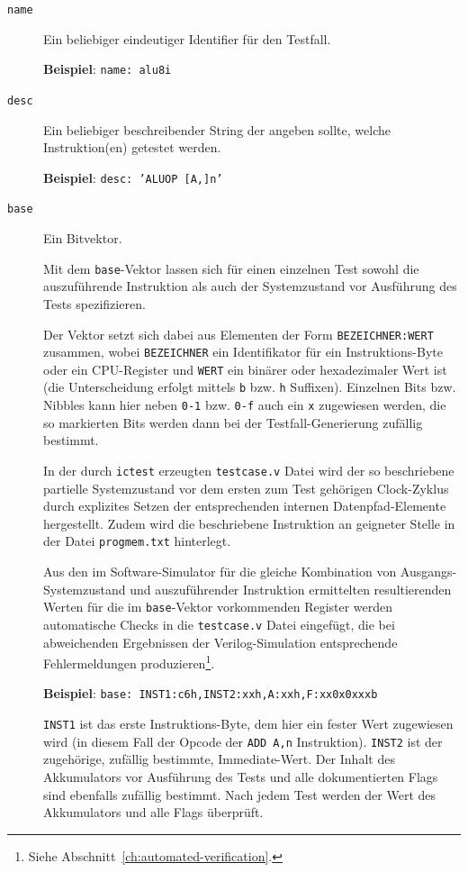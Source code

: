 \documentclass[ngerman, cd=lightcolor]{tudscrreprt}
\begin{document}
\begin{description}
\item[\texttt{name}] Ein beliebiger eindeutiger Identifier für den Testfall.

\textbf{Beispiel}: \texttt{name: alu8i}

\item[\texttt{desc}] Ein beliebiger beschreibender String der angeben sollte,
welche Instruktion(en) getestet werden.

\textbf{Beispiel}: \texttt{desc: 'ALUOP [A,]n'}

\item[\texttt{base}] Ein Bitvektor.

Mit dem \texttt{base}-Vektor lassen sich für einen einzelnen Test sowohl die
auszuführende Instruktion als auch der Systemzustand vor Ausführung des Tests
spezifizieren.

Der Vektor setzt sich dabei aus Elementen der Form \texttt{BEZEICHNER:WERT}
zusammen, wobei \texttt{BEZEICHNER} ein Identifikator für ein Instruktions-Byte
oder ein CPU-Register und \texttt{WERT} ein binärer oder hexadezimaler Wert ist
(die Unterscheidung erfolgt mittels \texttt{b} bzw. \texttt{h} Suffixen).
Einzelnen Bits bzw. Nibbles kann hier neben \texttt{0-1} bzw. \texttt{0-f} auch
ein \texttt{x} zugewiesen werden, die so markierten Bits werden dann bei der
Testfall-Generierung zufällig bestimmt.

In der durch \texttt{ictest} erzeugten \texttt{testcase.v} Datei wird der so
beschriebene partielle Systemzustand vor dem ersten zum Test gehörigen
Clock-Zyklus durch explizites Setzen der entsprechenden internen
Datenpfad-Elemente hergestellt. Zudem wird die beschriebene Instruktion an
geigneter Stelle in der Datei \texttt{progmem.txt} hinterlegt.

Aus den im Software-Simulator für die gleiche Kombination von
Ausgangs-Systemzustand und auszuführender Instruktion ermittelten
resultierenden Werten für die im \texttt{base}-Vektor vorkommenden Register
werden automatische Checks in die \texttt{testcase.v} Datei eingefügt, die bei
abweichenden Ergebnissen der Verilog-Simulation entsprechende Fehlermeldungen
produzieren\footnote{Siehe Abschnitt~\ref{ch:automated-verification}.}.

\textbf{Beispiel}: \texttt{base: INST1:c6h,INST2:xxh,A:xxh,F:xx0x0xxxb}

\texttt{INST1} ist das erste Instruktions-Byte, dem hier ein fester Wert
zugewiesen wird (in diesem Fall der Opcode der \texttt{ADD A,n} Instruktion).
\texttt{INST2} ist der zugehörige, zufällig bestimmte, Immediate-Wert. Der
Inhalt des Akkumulators vor Ausführung des Tests und alle dokumentierten Flags
sind ebenfalls zufällig bestimmt. Nach jedem Test werden der Wert des
Akkumulators und alle Flags überprüft.
\end{description}
\end{document}
